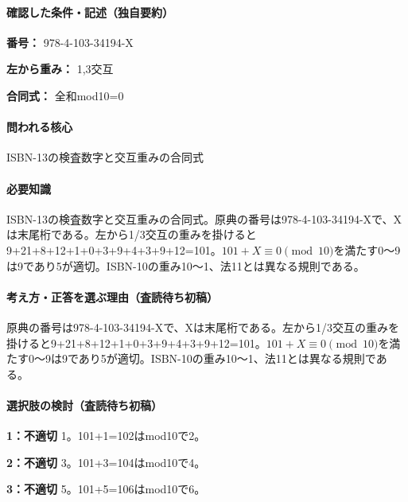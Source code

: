 \paragraph{確認した条件・記述（独自要約）}\mbox{}\par

\noindent\textbf{番号：} 978-4-103-34194-X\par

\noindent\textbf{左から重み：} 1,3交互\par

\noindent\textbf{合同式：} 全和mod10=\allowbreak{}0\par

\paragraph{問われる核心} ISBN-13の検査数字と交互重みの合同式

\paragraph{必要知識} ISBN-13の検査数字と交互重みの合同式。原典の番号は978-4-103-34194-Xで、Xは末尾桁である。左から1/3交互の重みを掛けると9+21+8+12+1+0+3+9+4+3+9+12=\allowbreak{}101。\(101+X\equiv0\pmod{10}\)を満たす0〜9は9であり5が適切。ISBN-10の重み10〜1、法11とは異なる規則である。

\paragraph{考え方・正答を選ぶ理由（査読待ち初稿）} 原典の番号は978-4-103-34194-Xで、Xは末尾桁である。左から1/3交互の重みを掛けると9+21+8+12+1+0+3+9+4+3+9+12=\allowbreak{}101。\(101+X\equiv0\pmod{10}\)を満たす0〜9は9であり5が適切。ISBN-10の重み10〜1、法11とは異なる規則である。

\paragraph{選択肢の検討（査読待ち初稿）}\mbox{}\par

\noindent\textbf{1：不適切} 1。101+1=\allowbreak{}102はmod10で2。\par

\noindent\textbf{2：不適切} 3。101+3=\allowbreak{}104はmod10で4。\par

\noindent\textbf{3：不適切} 5。101+5=\allowbreak{}106はmod10で6。\par

